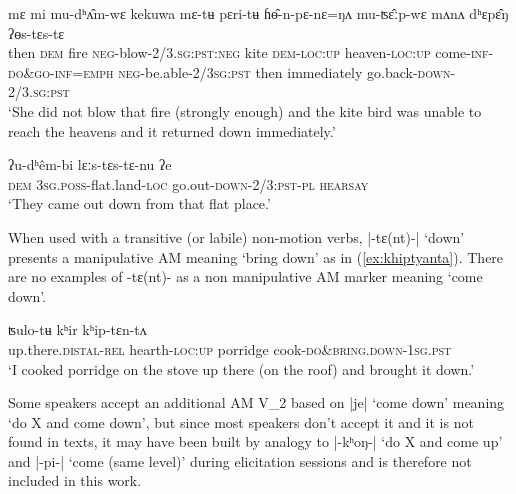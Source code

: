 \documentclass[oneside,a4paper,11pt]{article}
\newcommand{\ipa}[1]{{\phon#1}}
\newcommand{\dhatu}[2]{|\ipa{#1}| `#2'}
\begin{document}
\begin{exe}
\ex \label{ex:yostyastya}
 \gll \ipa{mʌnʌ}	\ipa{mɛ}	\ipa{mi}	\ipa{mu-dʰʌ̂m-wɛ}	\ipa{kekuwa}	\ipa{mɛ-tʉ}	\ipa{pɛri-tʉ}	\ipa{ɦɵ̂-n-pɛ-nɛ=ŋʌ}	\ipa{mu-ʦɛ̂ːp-wɛ}	\ipa{mʌnʌ}	\ipa{dʰɛpɛ̂ŋ}	\ipa{ʔɵs-tɛs-tɛ}	 \\
 then \textsc{dem} fire \textsc{neg}-blow-\textsc{2/3.sg:pst:neg} kite \textsc{dem}-\textsc{loc}:\textsc{up} heaven-\textsc{loc}:\textsc{up} come-\textsc{inf}-\textsc{do\&go}-\textsc{inf}=\textsc{emph} \textsc{neg}-be.able-\textsc{2/3sg:pst} then immediately go.back-\textsc{down}-2/3.\textsc{sg}:\textsc{pst} \\
   \glt `She did not blow that fire (strongly enough) and the kite bird was unable to reach the heavens and it returned down immediately.'
 \end{exe}
 
 \begin{exe}
\ex \label{ex:lyaastyastyanu}
 \gll  \ipa{mɛ}	\ipa{ʔu-dʰêm-bi}	\ipa{lɛːs-tɛs-tɛ-nu}	\ipa{ʔe}  \\
 \textsc{dem} \textsc{3sg.poss}-flat.land-\textsc{loc} go.out-\textsc{down}-2/3:\textsc{pst}-\textsc{pl} \textsc{hearsay} \\
 \glt `They came out down from that flat place.'
  \end{exe}
  
When used with a transitive (or labile) non-motion verbs, \dhatu{-tɛ(nt)-}{down} presents a manipulative AM meaning `bring down' as in (\ref{ex:khiptyanta}). There are no examples of \ipa{-tɛ(nt)-} as a non manipulative AM marker meaning `come down'.
 
\begin{exe}
\ex \label{ex:khiptyanta}
 \gll \ipa{tukkâ-m}	\ipa{ʦulo-tʉ}	\ipa{kʰir}	\ipa{kʰip-tɛn-tʌ} \\
  up.there.\textsc{distal}-\textsc{rel} hearth-\textsc{loc}:\textsc{up} porridge cook-\textsc{do\&bring.down}-\textsc{1sg}.\textsc{pst} \\
  \glt `I cooked porridge on the stove up there (on the roof) and brought it down.'
 \end{exe}
 
Some speakers accept an additional AM V_2 based on \dhatu{je}{come down} meaning `do X and come down', but since most speakers don't accept it and it is not found in texts, it may have been built by analogy to  \dhatu{-kʰoŋ-}{do X and come up} and \dhatu{-pi-}{come (same level)} during elicitation sessions and is therefore not included in this work.
 
\end{document}

